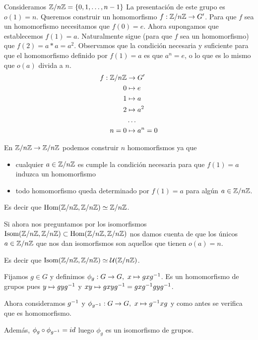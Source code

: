 \begin{ej}
	Consideramos $\mathbb{Z}/n\mathbb{Z} = \{0, 1, \dots, n-1\}$ La presentación de este grupo es $o(1) = n$. Queremos construir un homomorfismo $f:\mathbb{Z}/n\mathbb{Z} \to G'$. Para que $f$ sea un homomorfismo necesitamos que $f(0) = e$. Ahora supongamos que establecemos $f(1) = a$. Naturalmente sigue (para que $f$ sea un homomorfismo) que $f(2) = a\ast a = a^2$. Observamos que la condición necesaria y suficiente para que el homomorfismo definido por $f(1) = a$ es que $a^n = e$, o lo que es lo mismo que $o(a)$ divida a $n$.
	\begin{align*}
	f:\mathbb{Z}/n\mathbb{Z} &\to G' \\
	0 &\mapsto e \\
	1 &\mapsto a \\
	2 &\mapsto a^2\\
	&\dots \\
	n = 0 &\mapsto a^n = 0
	\end{align*}
\end{ej}

\begin{ej}
	En $\mathbb{Z}/n\mathbb{Z} \to \mathbb{Z}/n\mathbb{Z}$ podemos construir $n$ homomorfismos ya que
	\begin{itemize}
		\item cualquier $a \in \mathbb{Z}/n\mathbb{Z}$ es cumple la condición necesaria para que $f(1) = a$ induzca un homomorfismo
		\item todo homomorfismo queda determinado por $f(1) = a$ para algún $a \in \mathbb{Z}/n\mathbb{Z}$.
	\end{itemize}
	
	Es decir que $\text{Hom}(\mathbb{Z}/n\mathbb{Z}, \mathbb{Z}/n\mathbb{Z}) \simeq \mathbb{Z}/n\mathbb{Z}$.
\end{ej}

\begin{ej}
	Si ahora nos preguntamos por los isomorfismos $\text{Isom}(\mathbb{Z}/n\mathbb{Z}, \mathbb{Z}/n\mathbb{Z}) \subset \text{Hom}(\mathbb{Z}/n\mathbb{Z}, \mathbb{Z}/n\mathbb{Z})$ nos damos cuenta de que los únicos $a \in \mathbb{Z}/n\mathbb{Z}$ que nos dan isomorfismos son aquellos que tienen $o(a) = n$.
	
	Es decir que $\text{Isom}(\mathbb{Z}/n\mathbb{Z}, \mathbb{Z}/n\mathbb{Z}) \simeq \mathcal{U}(\mathbb{Z}/n\mathbb{Z})$.
\end{ej}

\begin{ej}
	Fijamos $g \in G$ y definimos $\phi_g:G \to G,\ x \mapsto gxg^{-1}$. Es un homomorfismo de grupos pues $y\mapsto gyg^{-1}$ y $xy \mapsto gxyg^{-1} = gxg^{-1}gyg^{-1}$.
	
	Ahora consideramos $g^{-1}$ y $\phi_{g^{-1}}: G \to G,\ x \mapsto g^{-1}xg$ y como antes se verifica que es homomorfismo.
	
	Además, $\phi_g \circ \phi_{g^{-1}} = id$ luego $\phi_g$ es un isomorfismo de grupos.
\end{ej}


